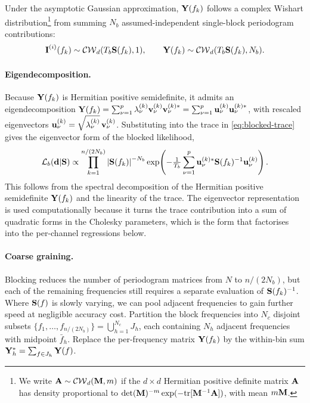 \documentclass[%
	reprint,
	nofootinbib,
	amsmath,
	amssymb,
	aps,
]{revtex4-2}
\begin{document}
	Under the asymptotic Gaussian approximation, $\Y(f_{k})$ follows a
	complex Wishart distribution\footnote{We write
	$\A\sim\mathcal{CW}_{d}(\M,m)$ if the $d\times d$ Hermitian positive
	definite matrix $\A$ has density proportional to
	$\det(\M)^{-m}\exp(-\tr[\M^{-1}\A])$, with mean $m\M$.}
	from summing $N_{b}$ assumed-independent single-block periodogram
	contributions:
	\[
		\I^{(i)}(f_{k})\sim\mathcal{CW}_{d}(T_{b}\S(f_{k}),1),
		\qquad
		\Y(f_{k})\sim\mathcal{CW}_{d}(T_{b}\S(f_{k}),N_{b}).
	\]

	\paragraph*{Eigendecomposition.}
	Because $\Y(f_{k})$ is Hermitian positive semidefinite, it admits an
	eigendecomposition
	$\Y(f_{k})=\sum_{\nu=1}^{p}\lambda^{(k)}_{\nu}\v^{(k)}_{\nu}\v^{(k)*}_{\nu}
	=\sum_{\nu=1}^{p}\u^{(k)}_{\nu}\u^{(k)*}_{\nu}$,
	with rescaled eigenvectors
	$\u^{(k)}_{\nu}=\sqrt{\lambda^{(k)}_{\nu}}\,\v^{(k)}_{\nu}$.
	Substituting into the trace in \eqref{eq:blocked-trace} gives the
	eigenvector form of the blocked likelihood,
	\begin{equation}
		\label{eq:log-like}
		\mathcal{L}_{b}(\d|\S)
		\propto \prod_{k=1}^{n/(2N_{b})} \left|\S(f_{k})\right|^{-N_{b}}
		\exp\!\left(-\tfrac{1}{T_{b}}\sum_{\nu=1}^{p}\u_{\nu}^{(k)*}\S(f_{k})^{-1}\u_{\nu}^{(k)}\right).
	\end{equation}
	This follows from the spectral decomposition of the Hermitian positive
	semidefinite $\Y(f_k)$ and the linearity of the trace. The
	eigenvector representation is used computationally because it turns the
	trace contribution into a sum of quadratic forms in the Cholesky
	parameters, which is the form that factorises into the per-channel
	regressions below.

	\paragraph{Coarse graining.}
	\label{subsec:coarse}
	Blocking reduces the number of periodogram matrices from $N$ to
	$n/(2N_{b})$, but each of the remaining frequencies still requires a
	separate evaluation of $\S(f_{k})^{-1}$. Where $\S(f)$ is slowly
	varying, we can pool adjacent frequencies to gain further speed at
	negligible accuracy cost. Partition the block frequencies into
	$N_{c}$ disjoint subsets
	$\{f_{1},\ldots,f_{n/(2N_{b})}\}=\bigcup_{h=1}^{N_{c}}J_{h}$, each
	containing $N_{h}$ adjacent frequencies with midpoint $\bar{f}_{h}$. 
	Replace the per-frequency matrix $\Y(f_{k})$ by the within-bin sum
	$\Y_{h}^{*}=\sum_{f\in J_{h}}\Y(f)$. 
\end{document}

